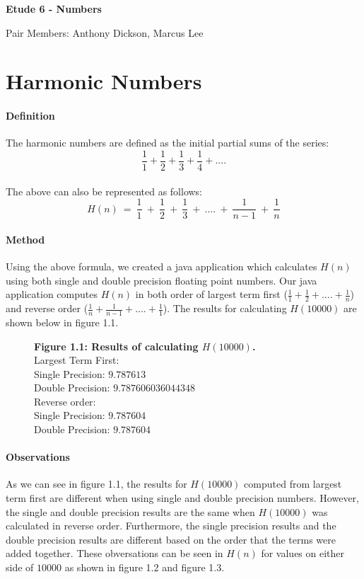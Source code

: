 \documentclass[12pt]{article}
\begin{document}
	
\begin{center}
\begin{LARGE}
\textbf{Etude 6 - Numbers}\\
\end{LARGE}
Pair Members: Anthony Dickson, Marcus Lee
\end{center}

\section{Harmonic Numbers}
\paragraph{Definition}
	The harmonic numbers are defined as the initial partial sums of the series:
	{\large $$\frac{1}{1} + \frac{1}{2} + \frac{1}{3} + \frac{1}{4} + ....$$}\\
	The above can also be represented as follows:
	{\large $$H(n)\ = \ \frac{1}{1} \ + \ \frac{1}{2} \ + \ \frac{1}{3} \ + \ .... \ +  \ \frac{1}{n-1} \ + \ \frac{1}{n}$$}

\paragraph{Method}
	Using the above formula, we created a java application which calculates $H(n)$ using both single and double precision floating point numbers. Our java application computes $H(n)$ in both order of largest term first ($\frac{1}{1} + \frac{1}{2} +  .... + \frac{1}{n}$) and reverse order ($\frac{1}{n} + \frac{1}{n - 1} +  .... + \frac{1}{1}$). The results for calculating $H(10000)$ are shown below in figure 1.1.

\begin{figure}[h]
	\textbf{Figure 1.1: Results of calculating $H(10000)$.}\\
	
	Largest Term First:\\
	Single Precision: $9.787613$\\
	Double Precision: $9.787606036044348$\\
	
	Reverse order:\\
	Single Precision: $9.787604$\\
	Double Precision: $9.787604$	
\end{figure}

\paragraph{Observations}
As we can see in figure 1.1, the results for $H(10000)$ computed from largest term first are different when using single and double precision numbers. However, the single and double precision results are the same when  $H(10000)$ was calculated in reverse order. Furthermore, the single precision results and the double precision results are different based on the order that the terms were added together. These obversations can be seen in $H(n)$ for values on either side of $10000$ as shown in figure 1.2 and figure 1.3.
\end{document}
